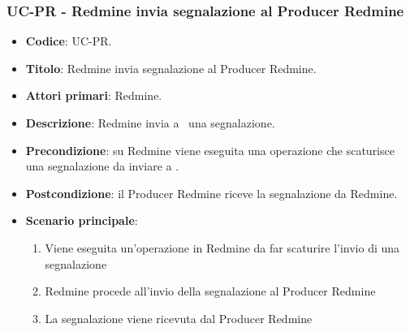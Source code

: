 \subsubsection{UC\theuccount-PR - Redmine invia segnalazione al Producer Redmine}
\begin{itemize}
	\item \textbf{Codice}: UC\theuccount-PR.
	\item \textbf{Titolo}: Redmine invia segnalazione al Producer Redmine.
	\item \textbf{Attori primari}: Redmine.
	\item \textbf{Descrizione}: Redmine invia a \progetto\ una segnalazione.
	\item \textbf{Precondizione}: su Redmine viene eseguita una operazione che scaturisce una
	segnalazione da inviare a \progetto.
	\item \textbf{Postcondizione}: il Producer Redmine riceve la segnalazione da Redmine.
	\item \textbf{Scenario principale}: 
	\begin{enumerate}
		\item Viene eseguita un'operazione in Redmine da far scaturire l'invio di una segnalazione
		\item Redmine procede all'invio della segnalazione al Producer Redmine
        \item La segnalazione viene ricevuta dal Producer Redmine
	\end{enumerate}
	
\end{itemize}


